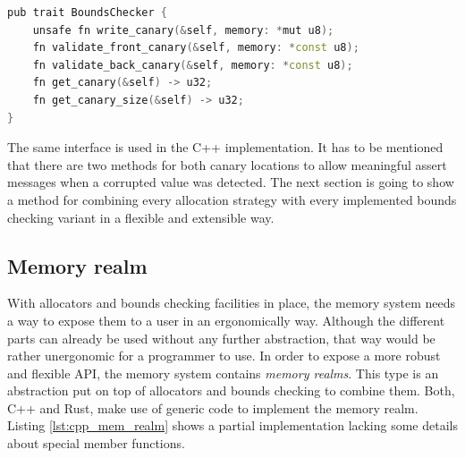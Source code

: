 \begin{lstlisting}[caption={Base trait of every bounds checker in the Rust memory system.}, label={lst:rust_bounds_check}, language={C++}]
pub trait BoundsChecker {
	unsafe fn write_canary(&self, memory: *mut u8);
	fn validate_front_canary(&self, memory: *const u8);
	fn validate_back_canary(&self, memory: *const u8);
	fn get_canary(&self) -> u32;
	fn get_canary_size(&self) -> u32;
}
\end{lstlisting}

\noindent
The same interface is used in the C++ implementation. It has to be mentioned that there are two methods for both canary locations to allow meaningful assert messages when a corrupted value was detected. The next section is going to show a method for combining every allocation strategy with every implemented bounds checking variant in a flexible and extensible way.

\subsection{Memory realm}

With allocators and bounds checking facilities in place, the memory system needs a way to expose them to a user in an ergonomically way. Although the different parts can already be used without any further abstraction, that way would be rather unergonomic for a programmer to use. In order to expose a more robust and flexible \ac{API}, the memory system contains \textit{memory realms}. This type is an abstraction put on top of allocators and bounds checking to combine them. Both, C++ and Rust, make use of generic code to implement the memory realm. Listing \ref{lst:cpp_mem_realm} shows a partial implementation lacking some details about special member functions. \\

